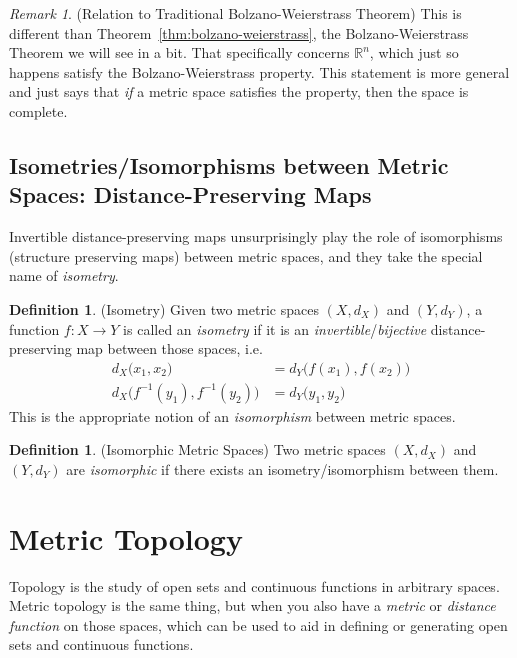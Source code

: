 \documentclass[12pt]{book}
\numberwithin{equation}{section} %
\theoremstyle{plain}
\theoremstyle{definition}
\newtheorem{defn}[thm]{Definition}
\theoremstyle{remark}
\newtheorem*{rmk}{Remark}
\newcommand{\ra}{\rightarrow}
\newcommand{\R}{\mathbb{R}}
\begin{document}
\begin{rmk}
(Relation to Traditional Bolzano-Weierstrass Theorem) This is different
than Theorem~\ref{thm:bolzano-weierstrass}, the Bolzano-Weierstrass
Theorem we will see in a bit. That specifically concerns $\R^n$,
which just so happens satisfy the Bolzano-Weierstrass property. This
statement is more general and just says that \emph{if} a metric space
satisfies the property, then the space is complete.
\end{rmk}



\clearpage
\subsection{Isometries/Isomorphisms between Metric Spaces: Distance-Preserving Maps}


Invertible distance-preserving maps unsurprisingly play the role of
isomorphisms (structure preserving maps) between metric spaces, and they
take the special name of \emph{isometry}.



\begin{defn}(Isometry)
Given two metric spaces $(X,d_X)$ and $(Y,d_Y)$, a function $f:X\ra Y$
is called an \emph{isometry} if it is an
\emph{invertible}/\emph{bijective} distance-preserving map between those
spaces, i.e.
\begin{align*}
  d_X\big(x_1,x_2\big)
  &= d_Y\big(f(x_1),f(x_2)\big)
  \\
  d_X\big(f^{-1}(y_1),f^{-1}(y_2)\big)
  &= d_Y\big(y_1,y_2\big)
\end{align*}
This is the appropriate notion of an \emph{isomorphism} between metric
spaces.
\end{defn}

\begin{defn}(Isomorphic Metric Spaces)
Two metric spaces $(X,d_X)$ and $(Y,d_Y)$ are \emph{isomorphic} if
there exists an isometry/isomorphism between them.
\end{defn}


\clearpage
\section{Metric Topology}

Topology is the study of open sets and continuous functions in arbitrary
spaces. Metric topology is the same thing, but when you also have a
\emph{metric} or \emph{distance function} on those spaces, which can be
used to aid in defining or generating open sets and continuous
functions.
\end{document}
